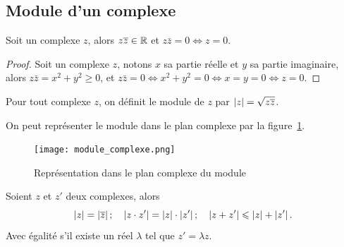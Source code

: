 \subsection{Module d'un complexe}\label{subsec:modulecomplexe}

\begin{prop}
  Soit un complexe \(z\), alors \(z \overline{z} \in{}\mathbb{R}\) et \(z \bar{z} = 0 \iff z 
  = 0\).
\end{prop}

\begin{proof}
  Soit un complexe \(z\), notons \(x\) sa partie réelle et \(y\) sa partie 
  imaginaire, alors \(z \bar{z} = x^2 + y^2 \geqslant 0\), et \(z \bar{z} = 0 
  \iff x^2 + y^2 = 0 \iff x = y = 0 \iff z = 0\).
\end{proof}

\begin{defdef}
  Pour tout complexe \(z\), on définit le module de \(z\) par \(\left\lvert z\right\rvert = 
  \sqrt{z \overline{z}}\).
\end{defdef}

On peut représenter le module dans le plan complexe par la 
figure~\ref{fig:moduleComplexe}.

\begin{figure}
  \centering
  \texttt{[image: module\_complexe.png]}
  \caption{Représentation dans le plan complexe du module}\label{fig:moduleComplexe}
\end{figure}

\begin{prop}
  Soient \(z\) et \(z'\) deux complexes, alors
  \begin{equation}
    \left\lvert z\right\rvert = \left\lvert\overline{z}\right\rvert; \quad \left\lvert z \cdot z'\right\rvert = \left\lvert z\right\rvert \cdot 
    \left\lvert z'\right\rvert; \quad \left\lvert z + z'\right\rvert\leqslant\left\lvert z\right\rvert + \left\lvert z'\right\rvert.
  \end{equation}
  Avec égalité s'il existe un réel \(\lambda\) tel que \(z' = \lambda z\).
\end{prop}

